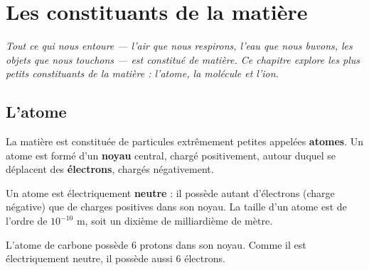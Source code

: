 \chapter{Les constituants de la matière}

\noindent\textit{Tout ce qui nous entoure — l'air que nous respirons, l'eau que nous
buvons, les objets que nous touchons — est constitué de matière. Ce chapitre explore les
plus petits constituants de la matière : l'atome, la molécule et l'ion.}
\vspace{8pt}

\connecteBanner

\section{L'atome}

\begin{definition}[Atome]
La matière est constituée de particules extrêmement petites appelées \textbf{atomes}. Un
atome est formé d'un \textbf{noyau} central, chargé positivement, autour duquel se
déplacent des \textbf{électrons}, chargés négativement.
\end{definition}

\begin{propriete}
Un atome est électriquement \textbf{neutre} : il possède autant d'électrons (charge
négative) que de charges positives dans son noyau. La taille d'un atome est de l'ordre de
$10^{-10}$ m, soit un dixième de milliardième de mètre.
\end{propriete}

\begin{illus}
\end{illus}

\begin{exemple}
L'atome de carbone possède $6$ protons dans son noyau. Comme il est électriquement
neutre, il possède aussi $6$ électrons.
\end{exemple}


